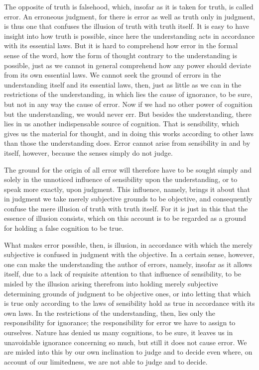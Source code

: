     The opposite of truth is falsehood, which,
    insofar as it is taken for truth, is called error.
    An erroneous judgment, for there is error as well as truth only in judgment,
    is thus one that confuses the illusion of truth with truth itself.
    It is easy to have insight into how truth is possible,
    since here the understanding acts in accordance with its essential laws.
    But it is hard to comprehend how error in the formal sense of the word,
    how the form of thought contrary to the understanding is possible,
    just as we cannot in general comprehend how any power
    should deviate from its own essential laws.
    We cannot seek the ground of errors in
    the understanding itself and its essential laws, then,
    just as little as we can in the restrictions of the understanding,
    in which lies the cause of ignorance, to be sure,
    but not in any way the cause of error.
    Now if we had no other power of cognition
    but the understanding, we would never err.
    But besides the understanding, there lies in us
    another indispensable source of cognition.
    That is sensibility, which gives us the material for thought, and
    in doing this works according to other laws than those the understanding does.
    Error cannot arise from sensibility in and by itself, however,
    because the senses simply do not judge.

    The ground for the origin of all error will therefore have to be sought
    simply and solely in the unnoticed influence of sensibility upon
    the understanding, or to speak more exactly, upon judgment.
    This influence, namely, brings it about that in judgment
    we take merely subjective grounds to be objective, and
    consequently confuse the mere illusion of truth with truth itself.
    For it is just in this that the essence of illusion consists,
    which on this account is to be regarded as a ground
    for holding a false cognition to be true.

    What makes error possible, then, is illusion,
    in accordance with which the merely subjective is
    confused in judgment with the objective.
    In a certain sense, however, one can make the understanding the author
    of errors, namely, insofar as it allows itself,
    due to a lack of requisite attention to that influence of sensibility,
    to be misled by the illusion arising therefrom into holding
    merely subjective determining grounds of judgment to be objective ones,
    or into letting that which is true only according to
    the laws of sensibility hold as true in accordance with its own laws.
    In the restrictions of the understanding, then,
    lies only the responsibility for ignorance;
    the responsibility for error we have to assign to ourselves.
    Nature has denied us many cognitions, to be sure,
    it leaves us in unavoidable ignorance concerning so much,
    but still it does not cause error.
    We are misled into this by our own inclination to judge and
    to decide even where, on account of our limitedness,
    we are not able to judge and to decide.

